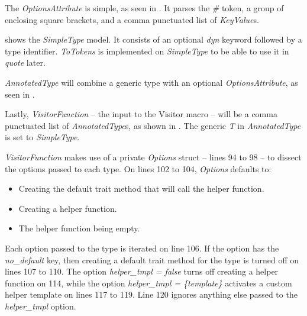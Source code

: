 The \textit{OptionsAttribute} is simple, as seen in .
It parses the \textit{\#} token, a group of enclosing square brackets, and a comma punctuated list of \textit{KeyValue}s.


 shows the \textit{SimpleType} model.
It consists of an optional \textit{dyn} keyword followed by a type identifier.
\textit{ToTokens} is implemented on \textit{SimpleType} to be able to use it in \textit{quote} later.


\textit{AnnotatedType} will combine a generic type with an optional \textit{OptionsAttribute}, as seen in .



Lastly, \textit{VisitorFunction} -- the input to the Visitor macro -- will be a comma punctuated list of \textit{AnnotatedType}s, as shown in .
The generic \textit{T} in \textit{AnnotatedType} is set to \textit{SimpleType}.


\textit{VisitorFunction} makes use of a private \textit{Options} struct -- lines 94 to 98 -- to dissect the options passed to each type.
On lines 102 to 104, \textit{Options} defaults to:

\begin{itemize}
	\item Creating the default trait method that will call the helper function.
	\item Creating a helper function.
	\item The helper function being empty.
\end{itemize}

Each option passed to the type is iterated on line 106.
If the option has the \textit{no\_default} key, then creating a default trait method for the type is turned off on lines 107 to 110.
The option \textit{helper\_tmpl = false} turns off creating a helper function on 114, while the option \textit{helper\_tmpl = \{template\}} activates a custom helper template on lines 117 to 119.
Line 120 ignores anything else passed to the \textit{helper\_tmpl} option.

